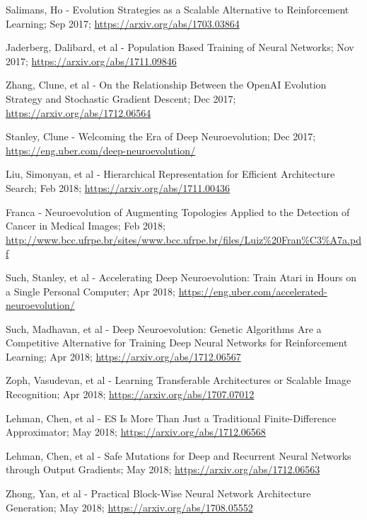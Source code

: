 \documentclass[journal, a4paper]{IEEEtran}
\begin{document}
\begin{thebibliography}{5}
    Salimans, Ho - Evolution Strategies as a Scalable Alternative to Reinforcement Learning; Sep 2017;
    \url{https://arxiv.org/abs/1703.03864}

    Jaderberg, Dalibard, et al - Population Based Training of Neural Networks; Nov 2017;
    \url{https://arxiv.org/abs/1711.09846}

    Zhang, Clune, et al - On the Relationship Between the OpenAI Evolution Strategy and Stochastic Gradient Descent; Dec 2017;
    \url{https://arxiv.org/abs/1712.06564}

    Stanley, Clune - Welcoming the Era of Deep Neuroevolution; Dec 2017;
    \url{https://eng.uber.com/deep-neuroevolution/}

    Liu, Simonyan, et al - Hierarchical Representation for Efficient Architecture Search; Feb 2018;
    \url{https://arxiv.org/abs/1711.00436}

    Franca - Neuroevolution of Augmenting Topologies Applied to the Detection of Cancer in Medical Images; Feb 2018;
    \url{http://www.bcc.ufrpe.br/sites/www.bcc.ufrpe.br/files/Luiz%20Fran%C3%A7a.pdf}

    Such, Stanley, et al - Accelerating Deep Neuroevolution: Train Atari in Hours on a Single Personal Computer; Apr 2018;
    \url{https://eng.uber.com/accelerated-neuroevolution/}

    Such, Madhavan, et al - Deep Neuroevolution: Genetic Algorithms Are a Competitive Alternative for Training Deep Neural Networks for Reinforcement Learning; Apr 2018;
    \url{https://arxiv.org/abs/1712.06567}

    Zoph, Vasudevan, et al - Learning Transferable Architectures or Scalable Image Recognition; Apr 2018;
    \url{https://arxiv.org/abs/1707.07012}

    Lehman, Chen, et al - ES Is More Than Just a Traditional Finite-Difference Approximator; May 2018;
    \url{https://arxiv.org/abs/1712.06568}

    Lehman, Chen, et al - Safe Mutations for Deep and Recurrent Neural Networks through Output Gradients; May 2018;
    \url{https://arxiv.org/abs/1712.06563}

    Zhong, Yan, et al - Practical Block-Wise Neural Network Architecture Generation; May 2018;
    \url{https://arxiv.org/abs/1708.05552}


\end{thebibliography}
\end{document}
